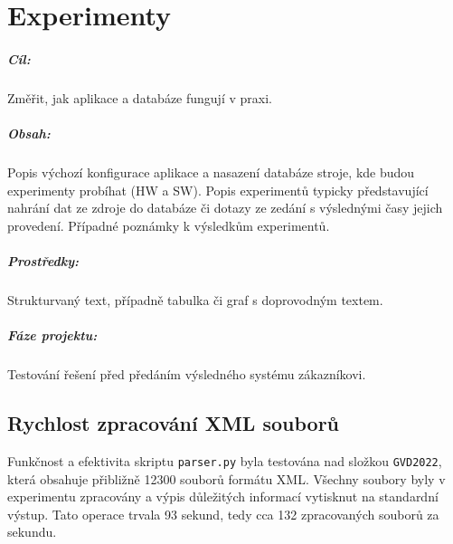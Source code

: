 \documentclass[10pt,xcolor=pdflatex,dvipsnames,table,oneside]{book}
\begin{document}
\chapter{Experimenty}

\paragraph{Cíl:}
Změřit, jak aplikace a databáze fungují v praxi.

\paragraph{Obsah:}
Popis výchozí konfigurace aplikace a nasazení databáze stroje, kde budou experimenty probíhat (HW a SW).
Popis experimentů typicky představující nahrání dat ze zdroje do databáze či dotazy ze zedání s výslednými časy jejich provedení.
Případné poznámky k výsledkům experimentů.

\paragraph{Prostředky:}
Strukturvaný text, případně tabulka či graf s doprovodným textem.

\paragraph{Fáze projektu:}
Testování řešení před předáním výsledného systému zákazníkovi.

\section{Rychlost zpracování XML souborů}
Funkčnost a efektivita skriptu \verb|parser.py| byla testována nad složkou \verb|GVD2022|, která obsahuje přibližně 12300 souborů formátu XML. Všechny soubory byly v experimentu zpracovány a výpis důležitých informací vytisknut na standardní výstup. Tato operace trvala 93 sekund, tedy cca 132 zpracovaných souborů za sekundu.
\end{document}
